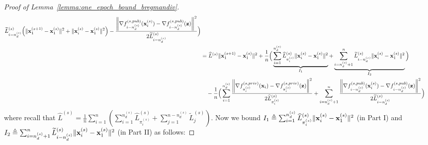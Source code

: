 \begin{proof}[Proof of Lemma~\ref{lemma:one_epoch_bound_bregmandiv}]
\begin{align}
            \widetilde{L}_{i-n_d^{(s)}}^{(s)} \Big( \|{\mathbf{x}}_1^{(s+1)} - {\mathbf{x}}_1^{(s)} \|^2 + \|{\mathbf{x}}_i^{(s)} - {\mathbf{x}}_1^{(s)}\|^2\Big)
        - \frac{\left\| \nabla f_{i-n_d^{(s)}}^{(s, pub)}({\mathbf{x}}_i^{(s)}) - \nabla f_{i-n_d^{(s)}}^{(s, pub)}({\mathbf{z}}) \right\|^2}{2\widetilde{L}_{i-n_d^{(s)}}^{(s)}}
        \Big)\\
    \label{eq:breg_diff_interm_2}
        &= \widehat{L}^{(s)} \|{\mathbf{x}}_{1}^{(s+1)} - {\mathbf{x}}_1^{(s)}\|^2 
        + \frac{1}{n} \Big( \underbrace{\sum_{i=1}^{n_d^{(s)}}
        \widehat{L}_{\pi_i^{(s)}}^{(s)}\|{\mathbf{x}}_i^{(s)} - {\mathbf{x}}_1^{(s)}\|^2}_{I_1}
        + \underbrace{\sum_{i=n_d^{(s)}+1}^{n} \widetilde{L}_{i-n_d^{(s)}}^{(s)}\|{\mathbf{x}}_i^{(s)} - {\mathbf{x}}_1^{(s)}\|^2}_{I_2}
        \Big)\\
        \nonumber
        &\quad - \frac{1}{n} \Big( 
        \sum_{i=1}^{n_d^{(s)}} \frac{ \left\|\nabla f_{\pi_i^{(s)}}^{(s, priv)}({\mathbf{x}}_i) - \nabla f_{\pi_i^{(s)}}^{(s, priv)}({\mathbf{z}}) \right\|^2}{2 \widehat{L}_{\pi_{i}^{(s)}}^{(s)}}
        + \sum_{i=n_d^{(s)}+1}^{n} \frac{\left\| \nabla f_{i-n_d^{(s)}}^{(s, pub)}({\mathbf{x}}_i^{(s)}) - \nabla f_{i-n_d^{(s)}}^{(s, pub)}({\mathbf{z}}) \right\|^2}{2\widetilde{L}_{i-n_d^{(s)}}^{(s)}}
        \Big)
    \end{align}
    where recall that $\widehat{L}^{(s)} = \frac{1}{n}\sum_{i=1}^{n} \left( \sum_{i=1}^{n_d^{(s)}} \widehat{L}_{\pi_i^{(s)}}^{(s)} + \sum_{j=1}^{n-n_d^{(s)}} \widetilde{L}_j^{(s)}  \right)$.
    Now we bound $I_1 \triangleq \sum_{i=1}^{n_d^{(s)}} \widehat{L}_{\pi_i^{(s)}}^{(s)} \|{\mathbf{x}}_i^{(s)} - {\mathbf{x}}_1^{(s)}\|^2$ (in Part I) and $I_2 \triangleq \sum_{i=n_d^{(s)}+1}^{n} \widetilde{L}_{i-n_d^{(s)}}^{(s)} \|{\mathbf{x}}_i^{(s)} - {\mathbf{x}}_1^{(s)}\|^2$ (in Part II) as follows:
    

\end{proof}
